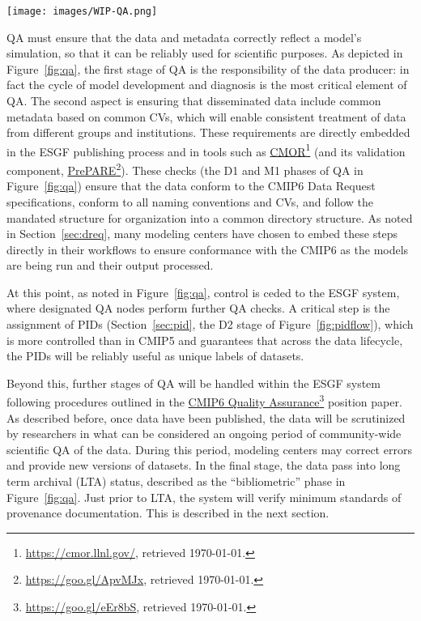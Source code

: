 \documentclass[gmd,manuscript]{copernicus}
\newcommand{\urlref}[2] {\href{#1}{#2}\footnote{\url{#1}, retrieved \today.}}
\begin{document}
\begin{figure*}
  \begin{center}
    \texttt{[image: images/WIP-QA.png]}
  \end{center}
  \caption{Schematic of the phases of quality assurance, with earlier
    stages in the hands of modeling centers (left), and more formal
    long-term data curation stages at right. Quality assurance is
    applied both to the data (D, above) as well as the metadata (M)
    describing the data. Figure drawn from the WIP's Quality Assurance
    position paper.}
  \label{fig:qa}
\end{figure*}

QA must ensure that the data and metadata correctly reflect a model's
simulation, so that it can be reliably used for scientific purposes.
As depicted in Figure~\ref{fig:qa}, the first stage of QA is the
responsibility of the data producer: in fact the cycle of model
development and diagnosis is the most critical element of QA. The
second aspect is ensuring that disseminated data include common
metadata based on common CVs, which will enable consistent treatment
of data from different groups and institutions. These requirements are
directly embedded in the ESGF publishing process and in tools such as
\urlref{https://cmor.llnl.gov/}{CMOR} (and its validation component,
\urlref{https://goo.gl/ApvMJx}{PrePARE}). These checks (the D1 and
M1 phases of QA in Figure~\ref{fig:qa}) ensure that the data conform to the
CMIP6 Data Request specifications, conform to all naming conventions
and CVs, and follow the mandated structure for organization into a
common directory structure. As noted in Section~\ref{sec:dreq}, many modeling
centers have chosen to embed these steps directly in their workflows
to ensure conformance with the CMIP6 as the models are being run and
their output processed.

At this point, as noted in Figure~\ref{fig:qa}, control is ceded to the ESGF
system, where designated QA nodes perform further QA checks. A
critical step is the assignment of PIDs (Section~\ref{sec:pid}, the D2 stage of
Figure~\ref{fig:pidflow}), which is more controlled than in CMIP5 and
guarantees that across the data lifecycle, the PIDs will be reliably
useful as unique labels of datasets.

Beyond this, further stages of QA will be handled within the ESGF
system following procedures outlined in the
\urlref{https://goo.gl/eEr8bS}{CMIP6 Quality Assurance} position paper.
As described before, once data have been published, the data will be
scrutinized by researchers in what can be considered an ongoing period
of community-wide scientific QA of the data. During this period,
modeling centers may correct errors and provide new versions of
datasets. In the final stage, the data pass into long term archival
(LTA) status, described as the ``bibliometric'' phase in Figure~\ref{fig:qa}.
Just prior to LTA, the system will verify minimum standards of
provenance documentation. This is described in the next section.
\end{document}
